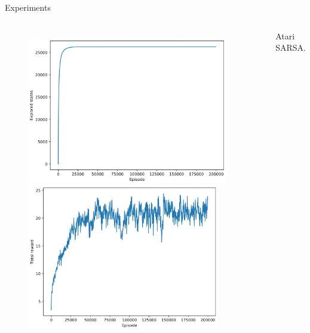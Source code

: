 \begin{frame}{Experiments}
    \begin{columns}[c,onlytextwidth]
            \begin{figure}
                \centering
                \includegraphics[width=0.94\textwidth]{images/atari-sarsa-explored-states.png}
                \includegraphics[width=0.9\textwidth]{images/atari-sarsa-total-reward.png}
            \end{figure}
            Atari SARSA.
    \end{columns}
\end{frame}
